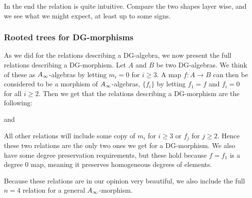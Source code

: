 In the end the relation is quite intuitive. Compare the two shapes layer wise, and we see what we might expect, at least up to some signs. 

\subsubsection{Rooted trees for DG-morphisms}
As we did for the relations describing a DG-algebra, we now present the full relations describing a DG-morphism. Let $A$ and $B$ be two DG-algebras. We think of these as $A_{\infty}$-algebras by letting $m_i =0$ for $i\geq 3$. A map $f\colon A\longrightarrow B$ can then be considered to be a morphism of $A_{\infty}$-algebras, $\{f_i\}$ by letting $f_1 = f$ and $f_i = 0$ for all $i\geq 2$. Then we get that the relations describing a DG-morphism are the following:


and 


All other relations will include some copy of $m_i$ for $i\geq 3$ or $f_j$ for $j\geq 2$. Hence these two relations are the only two ones we get for a DG-morphism. We also have some degree preservation requirements, but these hold because $f=f_1$ is a degree $0$ map, meaning it preserves homogeneous degrees of elements. 

Because these relations are in our opinion very beautiful, we also include the full $n=4$ relation for a general $A_{\infty}$-morphism. 


